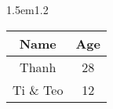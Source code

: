 \documentclass[12pt]{article}
\begin{document}
\blindtext

\begin{my-table-env}{1.5em}{1.2} %
    \begin{tabular}{|c|c|}
        \hline
        \rule{0pt}{5ex} %
        {\Large\textbf{Name}} & {\Large\textbf{Age}}
        \\[2ex] %
        \hline
        Thanh & 28 \\
        \hline
        Ti \& Teo & 12 \\
        \hline
    \end{tabular}
\end{my-table-env}

\blindtext
\end{document}

